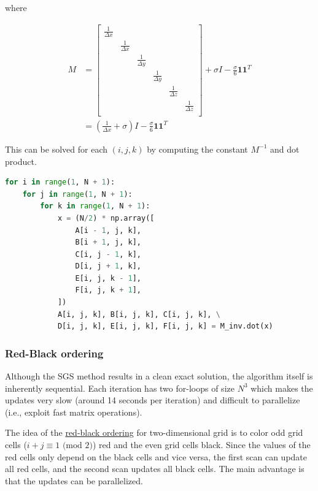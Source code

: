 \documentclass[11pt,titlepage]{article}
\begin{document}
where

\begin{equation*}
\begin{split}
    M &= \begin{bmatrix} \frac{1}{\Delta x} & & & & & \\
                         & \frac{1}{\Delta x} & & & & \\
                         & & \frac{1}{\Delta y} & & & \\
                         & & & \frac{1}{\Delta y} & & \\
                         & & & & \frac{1}{\Delta z}  & \\
                         & & & & & \frac{1}{\Delta z}\\\end{bmatrix}
         + \sigma I- \frac{\sigma}{6}\mathbf{1}\mathbf{1}^T \\
      &= (\frac{1}{\Delta x} + \sigma)I - \frac{\sigma}{6}\mathbf{1}\mathbf{1}^T
\end{split}
\end{equation*}

This can be solved for each $(i, j, k)$ by computing the constant $M^{-1}$ and dot product.

\begin{lstlisting}[language=python,caption={First Scan},captionpos=b]
for i in range(1, N + 1):
    for j in range(1, N + 1):
        for k in range(1, N + 1):
            x = (N/2) * np.array([
                A[i - 1, j, k],
                B[i + 1, j, k],
                C[i, j - 1, k],
                D[i, j + 1, k],
                E[i, j, k - 1],
                F[i, j, k + 1],
            ])
            A[i, j, k], B[i, j, k], C[i, j, k], \
            D[i, j, k], E[i, j, k], F[i, j, k] = M_inv.dot(x)
\end{lstlisting}


\subsubsection{Red-Black ordering}
Although the SGS method results in a clean exact solution, the algorithm itself is
inherently sequential. Each iteration has two for-loops of size $N^3$ which makes the updates very slow (around 14
seconds per iteration) and difficult to parallelize (i.e., exploit fast matrix operations).

The idea of the \href{https://math.mit.edu/classes/18.086/2006/am62.pdf}{red-black ordering} for two-dimensional grid is to color odd grid cells ($i + j \equiv 1 \text{ (mod }2)$)
red and the even grid cells black. Since the values of the red cells only depend on the black cells and vice versa, the
first scan can update all red cells, and the second scan updates all black cells. The main advantage is that the
updates can be parallelized.
\end{document}
